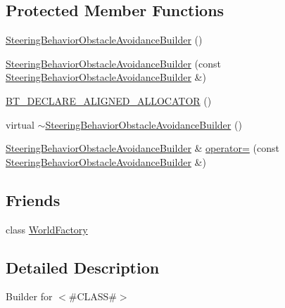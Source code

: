 \subsection*{Protected Member Functions}
\begin{DoxyCompactItemize}
\item 
\mbox{\hyperlink{classnjli_1_1_steering_behavior_obstacle_avoidance_builder_a13fe56fc366a4f5c956ca66534adab44}{Steering\+Behavior\+Obstacle\+Avoidance\+Builder}} ()
\item 
\mbox{\hyperlink{classnjli_1_1_steering_behavior_obstacle_avoidance_builder_a94fc09ddb4d1b1aaf6e69193272b1167}{Steering\+Behavior\+Obstacle\+Avoidance\+Builder}} (const \mbox{\hyperlink{classnjli_1_1_steering_behavior_obstacle_avoidance_builder}{Steering\+Behavior\+Obstacle\+Avoidance\+Builder}} \&)
\item 
\mbox{\hyperlink{classnjli_1_1_steering_behavior_obstacle_avoidance_builder_a7b1727d4efc7a695e271d2b93bee4b8a}{B\+T\+\_\+\+D\+E\+C\+L\+A\+R\+E\+\_\+\+A\+L\+I\+G\+N\+E\+D\+\_\+\+A\+L\+L\+O\+C\+A\+T\+OR}} ()
\item 
virtual \mbox{\hyperlink{classnjli_1_1_steering_behavior_obstacle_avoidance_builder_af11f994bd10c90902989e82ba0e0d916}{$\sim$\+Steering\+Behavior\+Obstacle\+Avoidance\+Builder}} ()
\item 
\mbox{\hyperlink{classnjli_1_1_steering_behavior_obstacle_avoidance_builder}{Steering\+Behavior\+Obstacle\+Avoidance\+Builder}} \& \mbox{\hyperlink{classnjli_1_1_steering_behavior_obstacle_avoidance_builder_ac74b5307c5c048bc54d1bbba15e8b055}{operator=}} (const \mbox{\hyperlink{classnjli_1_1_steering_behavior_obstacle_avoidance_builder}{Steering\+Behavior\+Obstacle\+Avoidance\+Builder}} \&)
\end{DoxyCompactItemize}
\subsection*{Friends}
\begin{DoxyCompactItemize}
\item 
class \mbox{\hyperlink{classnjli_1_1_steering_behavior_obstacle_avoidance_builder_acb96ebb09abe8f2a37a915a842babfac}{World\+Factory}}
\end{DoxyCompactItemize}


\subsection{Detailed Description}
Builder for $<$\#\+C\+L\+A\+SS\#$>$ 


